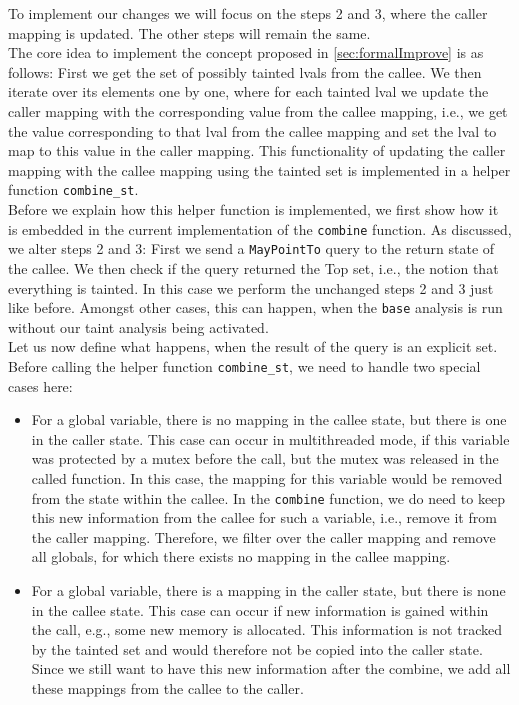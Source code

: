       To implement our changes we will focus on the steps 2 and 3, where the caller mapping is updated. The other steps will remain the same.\\
      The core idea to implement the concept proposed in \autoref{sec:formalImprove} is as follows: First we get the set of possibly tainted \ac{lval}s from the callee. We then iterate over its elements one by one, where for each tainted \ac{lval} we update the caller mapping with the corresponding value from the callee mapping, i.e., we get the value corresponding to that \ac{lval} from the callee mapping and set the \ac{lval} to map to this value in the caller mapping. This functionality of updating the caller mapping with the callee mapping using the tainted set is implemented in a helper function \texttt{combine\_st}.\\
      Before we explain how this helper function is implemented, we first show how it is embedded in the current implementation of the \texttt{combine} function. As discussed, we alter steps 2 and 3: First we send a \texttt{MayPointTo} query to the return state of the callee. We then check if the query returned the Top set, i.e., the notion that everything is tainted. In this case we perform the unchanged steps 2 and 3 just like before. Amongst other cases, this can happen, when the \texttt{base} analysis is run without our taint analysis being activated.\\
      Let us now define what happens, when the result of the query is an explicit set. Before calling the helper function \texttt{combine\_st}, we need to handle two special cases here:
      \begin{itemize}
        \item For a global variable, there is no mapping in the callee state, but there is one in the caller state. This case can occur in multithreaded mode, if this variable was protected by a mutex before the call, but the mutex was released in the called function. In this case, the mapping for this variable would be removed from the state within the callee. In the \texttt{combine} function, we do need to keep this new information from the callee for such a variable, i.e., remove it from the caller mapping. Therefore, we filter over the caller mapping and remove all globals, for which there exists no mapping in the callee mapping.

        \item For a global variable, there is a mapping in the caller state, but there is none in the callee state. This case can occur if new information is gained within the call, e.g., some new memory is allocated. This information is not tracked by the tainted set and would therefore not be copied into the caller state. Since we still want to have this new information after the combine, we add all these mappings from the callee to the caller.
      \end{itemize}
